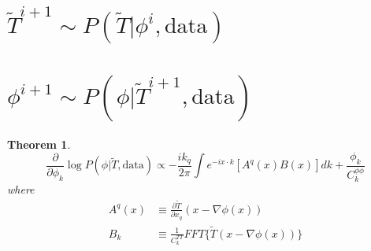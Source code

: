 \documentclass[11pt]{article}
\newtheorem{theorem}{Theorem}
\begin{document}
\section{$\widetilde T^{i+1}\sim P(\widetilde T |  \phi^{i},\text{data})$}

\section{$\phi^{i+1}\sim P(\phi | \widetilde T^{i+1},  \text{data})$}
\begin{theorem}
 \[\frac{\partial}{\partial \phi_k}\log P(\phi | \tilde T,  \text{data}) \propto -\frac{i k_q}{2\pi} \int e^{-i x\cdot k} [A^q(x)B(x)]dk + \frac{\phi_k}{C^{\phi\phi}_{k}}  \]
 where
 \begin{align}
 A^q(x) &\equiv \frac{\partial\tilde T}{\partial x_q}(x-\nabla \phi(x)) \\
 B_k &\equiv \frac{1}{C_k^{TT}} FFT\bigl\{\tilde T(x-\nabla \phi(x))\bigr\}
 \end{align}
\end{theorem}
\end{document}
